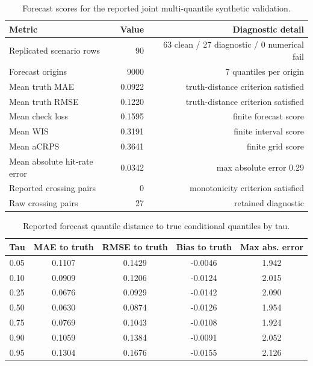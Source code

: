 \begin{table}[t]
\centering
\small
\begin{tabular}{@{}>{\raggedright\arraybackslash}p{}r@{\qquad}r@{}}
\toprule
Metric & Value & Diagnostic detail \\
\midrule
Replicated scenario rows & 90 & 63 clean / 27 diagnostic / 0 numerical fail \\
Forecast origins & 9000 & 7 quantiles per origin \\
Mean truth MAE & 0.0922 & truth-distance criterion satisfied \\
Mean truth RMSE & 0.1220 & truth-distance criterion satisfied \\
Mean check loss & 0.1595 & finite forecast score \\
Mean WIS & 0.3191 & finite interval score \\
Mean aCRPS & 0.3641 & finite grid score \\
Mean absolute hit-rate error & 0.0342 & max absolute error 0.29 \\
Reported crossing pairs & 0 & monotonicity criterion satisfied \\
Raw crossing pairs & 27 & retained diagnostic \\
\bottomrule
\end{tabular}
\caption{Forecast scores for the reported joint multi-quantile synthetic
validation.}
\label{tab:joint-qvp-phase4k-selected-scores}
\end{table}

\begin{table}[t]
\centering
\small
\begin{tabular}{@{}ccccc@{}}
\toprule
Tau & MAE to truth & RMSE to truth & Bias to truth & Max abs. error \\
\midrule
0.05 & 0.1107 & 0.1429 & -0.0046 & 1.942 \\
0.10 & 0.0909 & 0.1206 & -0.0124 & 2.015 \\
0.25 & 0.0676 & 0.0929 & -0.0142 & 2.090 \\
0.50 & 0.0630 & 0.0874 & -0.0126 & 1.954 \\
0.75 & 0.0769 & 0.1043 & -0.0108 & 1.924 \\
0.90 & 0.1059 & 0.1384 & -0.0091 & 2.052 \\
0.95 & 0.1304 & 0.1676 & -0.0155 & 2.126 \\
\bottomrule
\end{tabular}
\caption{Reported forecast quantile distance to true conditional quantiles by tau.}
\label{tab:joint-qvp-phase4k-truth-by-tau}
\end{table}

